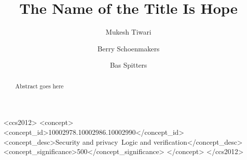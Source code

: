 \documentclass[sigconf]{acmart}
\begin{document}
\title{The Name of the Title Is Hope}


\author{Mukesh Tiwari}

\author{Berry Schoenmakers}


\author{Bas Spitters}

\renewcommand{\shortauthors}{Tiwari et al.}

\begin{abstract}
  Abstract goes here
\end{abstract}


\begin{CCSXML}
<ccs2012>
  <concept>
      <concept_id>10002978.10002986.10002990</concept_id>
      <concept_desc>Security and privacy~Logic and verification</concept_desc>
      <concept_significance>500</concept_significance>
      </concept>
</ccs2012>
\end{CCSXML}
  




\maketitle
\end{document}
